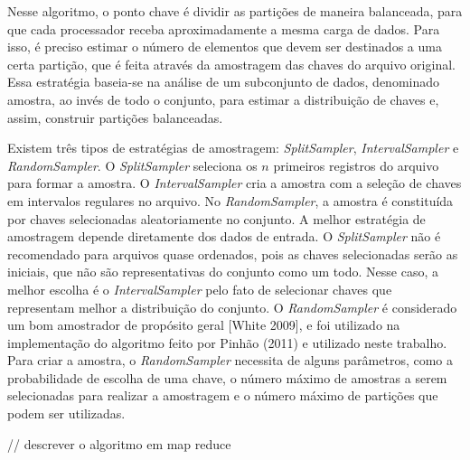 Nesse algoritmo, o ponto chave é dividir as partições de maneira balanceada, para que cada processador receba aproximadamente a mesma carga de dados. Para isso, é preciso estimar o número de elementos que devem ser destinados a uma certa partição, que é feita através da amostragem das chaves do arquivo original. Essa estratégia baseia-se na análise de um subconjunto de dados, denominado amostra, ao invés de todo o conjunto, para estimar a distribuição de chaves e, assim, construir partições balanceadas.

Existem três tipos de estratégias de amostragem: \textit{SplitSampler}, \textit{IntervalSampler} e \textit{RandomSampler}. O \textit{SplitSampler} seleciona os $n$ primeiros registros do arquivo para formar a amostra. O \textit{IntervalSampler} cria a amostra com a seleção de chaves em intervalos regulares no arquivo. No \textit{RandomSampler}, a amostra é constituída por chaves selecionadas aleatoriamente no conjunto. A melhor estratégia de amostragem depende diretamente dos dados de entrada. O \textit{SplitSampler} não é recomendado para arquivos quase ordenados, pois as chaves selecionadas serão as iniciais, que não são representativas do conjunto como um todo. Nesse caso, a melhor escolha é o \textit{IntervalSampler} pelo fato de selecionar chaves que representam melhor a distribuição do conjunto. O \textit{RandomSampler} é considerado um bom amostrador de propósito geral [White 2009], e foi utilizado na implementação do algoritmo feito por Pinhão (2011) e utilizado neste trabalho.
Para criar a amostra, o \textit{RandomSampler} necessita de alguns parâmetros, como a probabilidade de escolha de uma chave, o número máximo de amostras a serem selecionadas para realizar a amostragem e o número máximo de partições que podem ser utilizadas.

// descrever o algoritmo em map reduce
%


